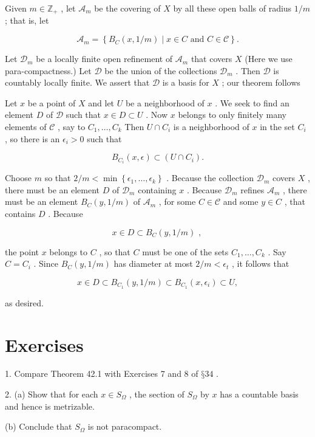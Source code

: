 Given \(m \in  {\mathbb{Z}}_{ + }\) , let \({\mathcal{A}}_{m}\) be the covering of \(X\) by all these open balls of radius \(1/m\) ; that is, let

\[
{\mathcal{A}}_{m} = \left\{  {{B}_{C}\left( {x,1/m}\right)  \mid  x \in  C\text{ and }C \in  \mathcal{C}}\right\}  .
\]

Let \({\mathcal{D}}_{m}\) be a locally finite open refinement of \({\mathcal{A}}_{m}\) that covers \(X\) (Here we use para-compactness.) Let \(\mathcal{D}\) be the union of the collections \({\mathcal{D}}_{m}\) . Then \(\mathcal{D}\) is countably locally finite. We assert that \(\mathcal{D}\) is a basis for \(X\) ; our theorem follows

Let \(x\) be a point of \(X\) and let \(U\) be a neighborhood of \(x\) . We seek to find an element \(D\) of \(\mathcal{D}\) such that \(x \in  D \subset  U\) . Now \(x\) belongs to only finitely many elements of \(\mathcal{C}\) , say to \({C}_{1},\ldots ,{C}_{k}\) Then \(U \cap  {C}_{i}\) is a neighborhood of \(x\) in the set \({C}_{i}\) , so there is an \({\epsilon }_{i} > 0\) such that

\[
{B}_{{C}_{i}}\left( {x,\epsilon }\right)  \subset  \left( {U \cap  {C}_{i}}\right) .
\]

Choose \(m\) so that \(2/m < \min \left\{  {{\epsilon }_{1},\ldots ,{\epsilon }_{k}}\right\}\) . Because the collection \({\mathcal{D}}_{m}\) covers \(X\) , there must be an element \(D\) of \({\mathcal{D}}_{m}\) containing \(x\) . Because \({\mathcal{D}}_{m}\) refines \({\mathcal{A}}_{m}\) , there must be an element \({B}_{C}\left( {y,1/m}\right)\) of \({\mathcal{A}}_{m}\) , for some \(C \in  \mathcal{C}\) and some \(y \in  C\) , that contains \(D\) . Because

\[
x \in  D \subset  {B}_{C}\left( {y,1/m}\right) \text{ , }
\]

the point \(x\) belongs to \(C\) , so that \(C\) must be one of the sets \({C}_{1},\ldots ,{C}_{k}\) . Say \(C = {C}_{i}\) . Since \({B}_{C}\left( {y,1/m}\right)\) has diameter at most \(2/m < {\epsilon }_{t}\) , it follows that

\[
x \in  D \subset  {B}_{{C}_{1}}\left( {y,1/m}\right)  \subset  {B}_{{C}_{1}}\left( {x,{\epsilon }_{i}}\right)  \subset  U,
\]

as desired.

\section*{Exercises}

1. Compare Theorem 42.1 with Exercises 7 and 8 of \(§{34}\) .

2. (a) Show that for each \(x \in  {S}_{\Omega }\) , the section of \({S}_{\Omega }\) by \(x\) has a countable basis and hence is metrizable.

(b) Conclude that \({S}_{\Omega }\) is not paracompact.
